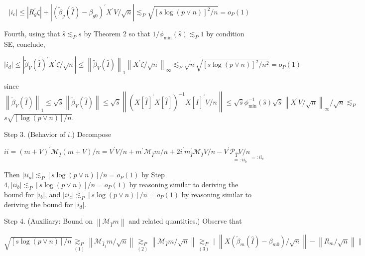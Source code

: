 \documentclass[10pt]{article}
\begin{document}
\[
\left|i_{c}\right| \leqslant\left|R_{g}^{\prime} \zeta\right|+\left|\left(\tilde{\beta}_{g}(\widehat{I})-\beta_{g 0}\right)^{\prime} X^{\prime} V / \sqrt{n}\right| \lesssim_{P} \sqrt{[s \log (p \vee n)]^{2} / n}=o_{P}(1)
\]

Fourth, using that \(\widehat{s} \lesssim_{P} s\) by Theorem 2 so that \(1 / \phi_{\min }(\widehat{s}) \lesssim_{P} 1\) by condition SE, conclude,

\[
\left|i_{d}\right| \leqslant\left|\tilde{\beta}_{V}(\widehat{I})^{\prime} X^{\prime} \zeta / \sqrt{n}\right| \leqslant\left\|\tilde{\beta}_{V}(\widehat{I})\right\|_{1}\left\|X^{\prime} \zeta / \sqrt{n}\right\|_{\infty} \lesssim_{P} \sqrt{n} \sqrt{[s \log (p \vee n)]^{2} / n^{2}}=o_{P}(1)
\]

since \(\left\|\tilde{\beta}_{V}(\widehat{I})\right\|_{1} \leqslant \sqrt{\hat{s}}\left\|\tilde{\beta}_{V}(\widehat{I})\right\| \leqslant \sqrt{\hat{s}}\left\|\left(X[\widehat{I}]^{\prime} X[\widehat{I}]\right)^{-1} X[\widehat{I}]^{\prime} V / n\right\| \leqslant \sqrt{\widehat{s}} \phi_{\min }^{-1}(\widehat{s}) \sqrt{\hat{s}}\left\|X^{\prime} V / \sqrt{n}\right\|_{\infty} / \sqrt{n} \lesssim_{P}\) \(s \sqrt{[\log (p \vee n)] / n}\).

Step 3. (Behavior of \(i\).) Decompose

\[
i i=(m+V)^{\prime} \mathcal{M}_{\widehat{I}}(m+V) / n=V^{\prime} V / n+m^{\prime} \mathcal{M}_{\widehat{I}} m / n+2 i^{\prime} m_{\widehat{I}}^{\prime} \mathcal{M}_{\widehat{I}} V / n-V^{\prime} \underset{=: i i_{b}}{\mathcal{P}_{\widehat{T}} V / n} \underset{=: i i_{c}}{ }
\]

Then \(\left|i i_{a}\right| \lesssim_{P}[s \log (p \vee n)] / n=o_{P}(1)\) by Step \(4,\left|i i_{b}\right| \lesssim_{P}[s \log (p \vee n)] / n=o_{P}(1)\) by reasoning similar to deriving the bound for \(\left|i_{b}\right|\), and \(\left|i i_{c}\right| \lesssim_{P}[s \log (p \vee n)] / n=o_{P}(1)\) by reasoning similar to deriving the bound for \(\left|i_{d}\right|\).

Step 4. (Auxiliary: Bound on \(\left\|\mathcal{M}_{\widehat{I}} m\right\|\) and related quantities.) Observe that

\[
\sqrt{[s \log (p \vee n)] / n} \underset{(1)}{\gtrsim_{P}}\left\|\mathcal{M}_{\widehat{I}_{1}} m / \sqrt{n}\right\| \underset{(2)}{\gtrsim_{P}}\left\|\mathcal{M}_{\widehat{I}} m / \sqrt{n}\right\| \underset{(3)}{\gtrsim_{P}} \mid\left\|X\left(\tilde{\beta}_{m}(\widehat{I})-\beta_{m 0}\right) / \sqrt{n}\right\|-\left\|R_{m} / \sqrt{n}\right\| \|
\]
\end{document}
